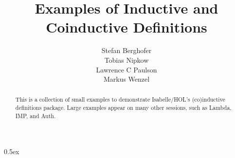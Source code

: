 \documentclass[11pt,a4paper]{article}
\begin{document}
\title{Examples of Inductive and Coinductive Definitions}
\author{Stefan Berghofer \\ Tobias Nipkow \\ Lawrence C Paulson \\ Markus Wenzel}
\maketitle

\begin{abstract}
  This is a collection of small examples to demonstrate Isabelle/HOL's
  (co)inductive definitions package.  Large examples appear on many other
  sessions, such as Lambda, IMP, and Auth.
\end{abstract}

\tableofcontents
\newpage

\parindent 0pt\parskip 0.5ex

\end{document}
